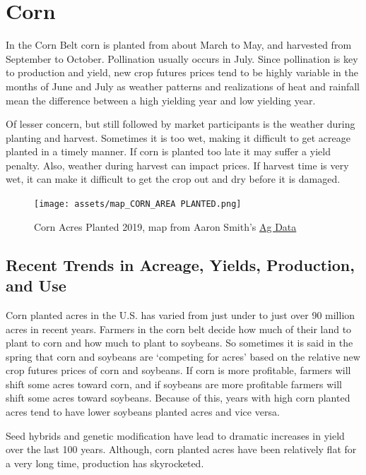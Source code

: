 \documentclass[
]{book}
\begin{document}
\hypertarget{corn}{%
\section{Corn}\label{corn}}

In the Corn Belt corn is planted from about March to May, and harvested from September to October. Pollination usually occurs in July. Since pollination is key to production and yield, new crop futures prices tend to be highly variable in the months of June and July as weather patterns and realizations of heat and rainfall mean the difference between a high yielding year and low yielding year.

Of lesser concern, but still followed by market participants is the weather during planting and harvest. Sometimes it is too wet, making it difficult to get acreage planted in a timely manner. If corn is planted too late it may suffer a yield penalty. Also, weather during harvest can impact prices. If harvest time is very wet, it can make it difficult to get the crop out and dry before it is damaged.

\begin{figure}
\centering
\texttt{[image: assets/map\_CORN\_AREA PLANTED.png]}
\caption{Corn Acres Planted 2019, map from Aaron Smith's \href{https://asmith.ucdavis.edu/data/us-crops}{Ag Data}}
\end{figure}

\hypertarget{recent-trends-in-acreage-yields-production-and-use}{%
\subsection{Recent Trends in Acreage, Yields, Production, and Use}\label{recent-trends-in-acreage-yields-production-and-use}}

Corn planted acres in the U.S. has varied from just under to just over 90 million acres in recent years. Farmers in the corn belt decide how much of their land to plant to corn and how much to plant to soybeans. So sometimes it is said in the spring that corn and soybeans are `competing for acres' based on the relative new crop futures prices of corn and soybeans. If corn is more profitable, farmers will shift some acres toward corn, and if soybeans are more profitable farmers will shift some acres toward soybeans. Because of this, years with high corn planted acres tend to have lower soybeans planted acres and vice versa.

Seed hybrids and genetic modification have lead to dramatic increases in yield over the last 100 years. Although, corn planted acres have been relatively flat for a very long time, production has skyrocketed.
\end{document}
